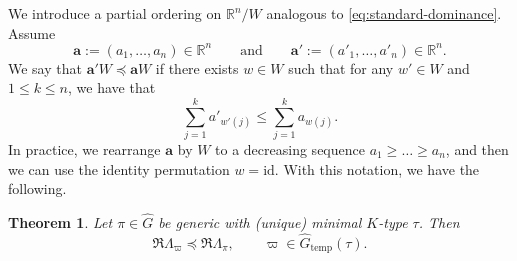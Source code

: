 \documentclass[11pt,oneside]{amsart}
\numberwithin{equation}{section}
\theoremstyle{remark}
\theoremstyle{plain}
\newtheorem{theorem}{Theorem}
\newcommand\id{\mathrm{id}}
\newcommand\RR{\mathbb{R}}
\newcommand{\ba}{\mathbf{a}}
\renewcommand\leq{\leqslant}
\renewcommand\geq{\geqslant}
\newcommand\Gtemp{\widehat{G}_\mathrm{temp}}
\begin{document}
We introduce a partial ordering on $\RR^n/W$ analogous to \eqref{eq:standard-dominance}. Assume
\begin{equation}\label{eq:aa'}
\ba:=(a_1,\dotsc,a_n)\in\RR^n \qquad \text{and} \qquad \ba':=(a'_1,\dotsc,a'_n)\in\RR^n.
\end{equation}
We say that $\ba'W\preceq \ba W$ if there exists $w\in W$ such that for any $w'\in W$ and $1\leq k\leq n$, we have that
\[
\sum_{j=1}^k a'_{w'(j)} \leq \sum_{j=1}^k a_{w(j)}.
\]
In practice, we rearrange $\ba$ by $W$ to a decreasing sequence $a_1\geq \dotsc \geq a_n$, and then we can use the identity permutation $w={\id}$.
With this notation, we have the following.
\begin{theorem}\label{theorem:K-type-barrier}
Let $\pi\in\widehat{G}$ be generic with (unique) minimal $K$-type $\tau$. Then
\[\Re\Lambda_{\varpi}\preceq\Re\Lambda_{\pi},\qquad\varpi\in\Gtemp(\tau).\]
\end{theorem}
\end{document}
